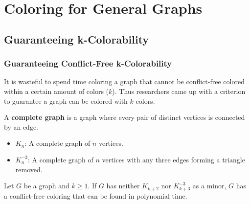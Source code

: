 \documentclass[xcolor=dvipsnames,aspectratio=1610]{beamer}
\begin{document}



  \section{Coloring for General Graphs}
  \subsection{Guaranteeing k-Colorability}
  \begin{frame}
    \frametitle{Guaranteeing Conflict-Free k-Colorability}

    It is wasteful to spend time coloring a graph that cannot be conflict-free colored within a certain amount of colors ($k$). Thus researchers came up with a criterion to guarantee a graph can be colored with $k$ colors.

    \pause
    \vfill

    A \textbf{complete graph} is a graph where every pair of distinct vertices is connected by an edge.

    \pause

    \begin{itemize}
      \item $K_n$: A complete graph of $n$ vertices.
      \pause
      \item $K_n^{-3}$: A complete graph of $n$ vertices with any three edges forming a triangle removed.
    \end{itemize}

    \pause
    \vfill

    \begin{theorem}
    Let $G$ be a graph and $k \geq 1$. If $G$ has neither $K_{k+2}$ nor $K_{k+3}^{-3}$ as a minor, $G$ has a conflict-free coloring that can be found in polynomial time.
    \end{theorem}

  \end{frame}
\end{document}
